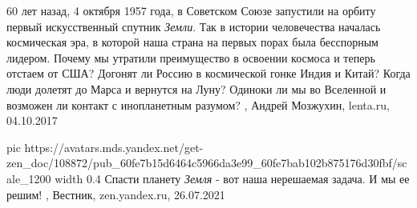 60 лет назад, 4 октября 1957 года, в Советском Союзе запустили на орбиту первый
искусственный спутник \emph{Земли}. Так в истории человечества началась космическая
эра, в которой наша страна на первых порах была бесспорным лидером. Почему мы
утратили преимущество в освоении космоса и теперь отстаем от США? Догонят ли
Россию в космической гонке Индия и Китай? Когда люди долетят до Марса и
вернутся на Луну? Одиноки ли мы во Вселенной и возможен ли контакт с
инопланетным разумом?
, 
Андрей Мозжухин, lenta.ru, 04.10.2017

\ifcmt
  pic https://avatars.mds.yandex.net/get-zen_doc/108872/pub_60fe7b15d6464c5966da3e99_60fe7bab102b875176d30fbf/scale_1200
  width 0.4
\fi
Спасти планету \emph{Земля} - вот наша нерешаемая задача. И мы ее решим!
, Вестник, zen.yandex.ru, 26.07.2021 
